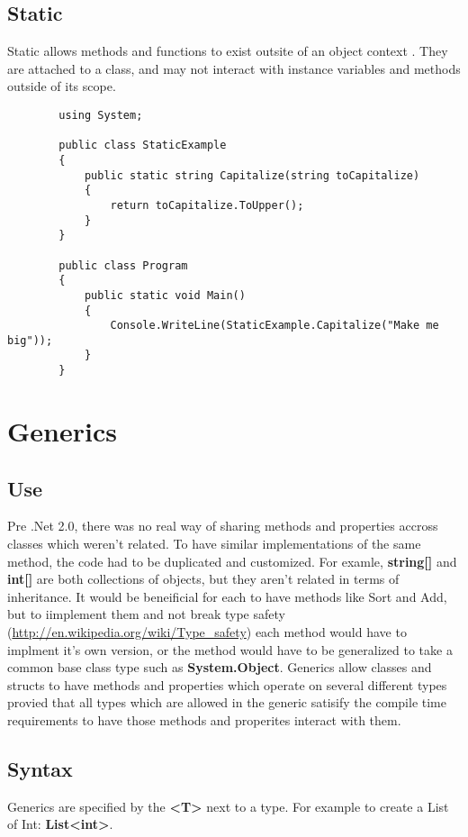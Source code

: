 \documentclass {amsart}
\begin{document}
	\subsection{Static}  Static allows methods and functions to exist outsite of an object context . They are attached to a class, and may not interact with instance variables and methods outside of its scope.  
		\begin{lstlisting}
		using System;

		public class StaticExample 
		{
			public static string Capitalize(string toCapitalize)
			{
				return toCapitalize.ToUpper();
			}
		}

		public class Program
		{
			public static void Main()
			{
				Console.WriteLine(StaticExample.Capitalize("Make me big"));
			}
		}

		\end{lstlisting}

	\section{Generics}
		\subsection{Use}  Pre .Net 2.0, there was no real way of sharing methods and properties accross classes which weren't related.  To have similar implementations of the same method, the code had to be duplicated and customized.  For examle, {\bf string[] } and {\bf int[]} are both collections of objects, but they aren't related in terms of inheritance.  It would be beneificial for each to have methods like Sort and Add, but to iimplement them and not break type safety (\url{http://en.wikipedia.org/wiki/Type_safety}) each method would have to implment it's own version, or the method would have to be generalized to take a common base class type such as {\bf System.Object}.  Generics allow classes and structs to have methods and properties which operate on several different types provied that all types which are allowed in the generic satisify the compile time requirements to have those methods and properites interact with them.  
		\subsection{Syntax}  Generics are specified by the {\bf \textless T\textgreater} next to a type.  For example to create a List of Int: {\bf List\textless int\textgreater}.  
\end{document}
